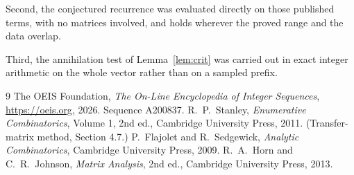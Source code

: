 \documentclass[11pt,a4paper]{article}
\theoremstyle{plain}
\theoremstyle{definition}
\begin{document}
Second, the conjectured recurrence was evaluated directly on those published terms, with no
matrices involved, and holds wherever the proved range and the data overlap.

Third, the annihilation test of Lemma~\ref{lem:crit} was carried out in exact integer
arithmetic on the whole vector rather than on a sampled prefix.

\begin{thebibliography}{9}
 The OEIS Foundation, \emph{The On-Line Encyclopedia of Integer
Sequences}, \url{https://oeis.org}, 2026. Sequence A200837.
 R.~P.~Stanley, \emph{Enumerative Combinatorics}, Volume 1, 2nd ed.,
Cambridge University Press, 2011. (Transfer-matrix method, Section 4.7.)
 P.~Flajolet and R.~Sedgewick, \emph{Analytic Combinatorics}, Cambridge
University Press, 2009.
 R.~A.~Horn and C.~R.~Johnson, \emph{Matrix Analysis}, 2nd ed., Cambridge
University Press, 2013.
\end{thebibliography}
\end{document}
